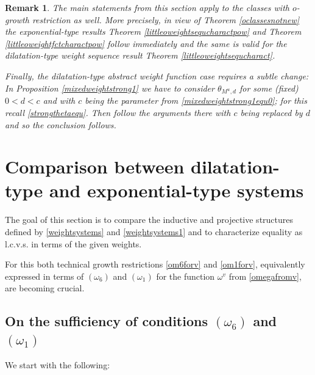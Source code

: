 \documentclass[10pt]{amsart}%
\numberwithin{equation}{section}
\theoremstyle{plain}
\newtheorem{remark}[proposition]{Remark}
\begin{document}
\begin{remark}
\emph{The main statements from this section apply to the classes with $o$-growth restriction as well. More precisely, in view of Theorem \ref{oclassesnotnew} the exponential-type results Theorem \ref{littleoweightsequcharactpow} and Theorem \ref{littleoweightfctcharactpow} follow immediately and the same is valid for the dilatation-type weight sequence result Theorem \ref{littleoweightsequcharact}.}
	
\emph{Finally, the dilatation-type abstract weight function case requires a subtle change: In Proposition \ref{mixedweightstrong1} we have to consider $\theta_{M^u,d}$ for some (fixed) $0<d<c$ and with $c$ being the parameter from \eqref{mixedweightstrong1equ0}; for this recall \eqref{strongthetaequ}. Then follow the arguments there with $c$ being replaced by $d$ and so the conclusion follows.}
\end{remark}


\section{Comparison between dilatation-type and exponential-type systems}\label{compdilaexposection}
The goal of this section is to compare the inductive and projective structures defined by \eqref{weightsystems} and \eqref{weightsystems1} and to characterize equality as l.c.v.s. in terms of the given weights.

For this both technical growth restrictions \eqref{om6forv} and \eqref{om1forv}, equivalently expressed in terms of \hyperlink{om6}{$(\omega_6)$} and \hyperlink{om1}{$(\omega_1)$} for the function $\omega^v$ from \eqref{omegafromv}, are becoming crucial.

\subsection{On the sufficiency of conditions $(\omega_6)$ and $(\omega_1)$}
We start with the following:
\end{document}
